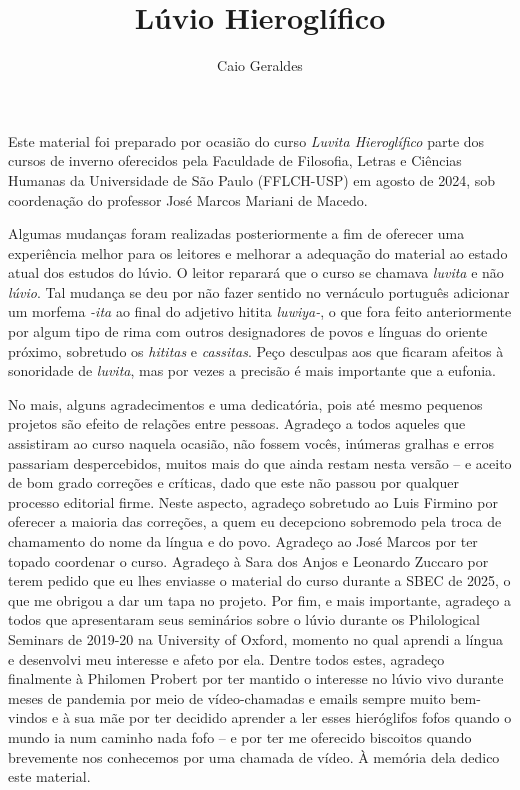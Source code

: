 \documentclass[apostila]{luvio}
\title{Lúvio Hieroglífico}
\author{Caio Geraldes}
\begin{document}
\frontmatter

\thetitlepage%


\cleardoublepage%


\cleardoublepage%
\tableofcontents*

\cleardoublepage%
\listoffigures*


Este material foi preparado por ocasião do curso \emph{Luvita Hieroglífico}
parte dos cursos de inverno oferecidos pela Faculdade de Filosofia, Letras e
Ciências Humanas da Universidade de São Paulo (FFLCH-USP) em agosto de 2024, sob
coordenação do professor José Marcos Mariani de Macedo.

Algumas mudanças foram realizadas posteriormente a fim de oferecer uma
experiência melhor para os leitores e melhorar a adequação do material ao estado
atual dos estudos do lúvio.
O leitor reparará que o curso se chamava \emph{luvita} e não \emph{lúvio}.
Tal mudança se deu por não fazer sentido no vernáculo português adicionar um
morfema \emph{-ita} ao final do adjetivo hitita \emph{luwiya-}, o que fora feito
anteriormente por algum tipo de rima com outros designadores de povos e línguas
do oriente próximo, sobretudo os \emph{hititas} e \emph{cassitas}.
Peço desculpas aos que ficaram afeitos à sonoridade de \emph{luvita}, mas por
vezes a precisão é mais importante que a eufonia.

No mais, alguns agradecimentos e uma dedicatória, pois até mesmo pequenos
projetos são efeito de relações entre pessoas.
Agradeço a todos aqueles que assistiram ao curso naquela ocasião, não
fossem vocês, inúmeras gralhas e erros passariam despercebidos, muitos mais do
que ainda restam nesta versão -- e aceito de bom grado correções e críticas,
dado que este não passou por qualquer processo editorial firme.
Neste aspecto, agradeço sobretudo ao Luis Firmino por oferecer a maioria das
correções, a quem eu decepciono sobremodo pela troca de chamamento do nome da
língua e do povo.
Agradeço ao José Marcos por ter topado coordenar o curso.
Agradeço à Sara dos Anjos e Leonardo Zuccaro por terem pedido que eu lhes enviasse o
material do curso durante a SBEC de 2025, o que me obrigou a dar um tapa no
projeto.
Por fim, e mais importante, agradeço a todos que apresentaram seus seminários
sobre o lúvio durante os Philological Seminars de 2019-20 na University of
Oxford, momento no qual aprendi a língua e desenvolvi meu interesse e afeto por
ela.
Dentre todos estes, agradeço finalmente à Philomen Probert por ter mantido o
interesse no lúvio vivo durante meses de pandemia por meio de vídeo-chamadas e
emails sempre muito bem-vindos e à sua mãe por ter decidido aprender a ler esses
hieróglifos fofos quando o mundo ia num caminho nada fofo -- e por ter me oferecido
biscoitos quando brevemente nos conhecemos por uma chamada de vídeo.
À memória dela dedico este material.
\end{document}
